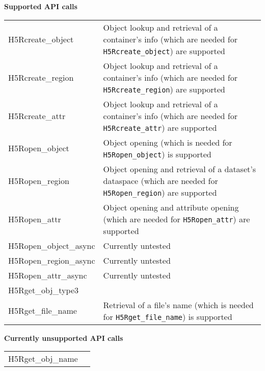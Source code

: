 \documentclass[../users_guide.tex]{subfiles}
\begin{document}
\begin{center}

\textbf{Supported API calls}
\vspace{.2in} \\

\begin{tabularx}{\linewidth}{| X | >{\RaggedRight}X |}
\hline
\rowcolor{lightgray!50}%
\multicolumn{1}{| c |}{\textbf{API call}} & \multicolumn{1}{c |}{\textbf{Notes}} \\ \hline

H5Rcreate\_object & Object lookup and retrieval of a container's info (which are needed for \texttt{H5Rcreate\_object}) are supported\\ \hline
H5Rcreate\_region & Object lookup and retrieval of a container's info (which are needed for \texttt{H5Rcreate\_region}) are supported\\ \hline
H5Rcreate\_attr & Object lookup and retrieval of a container's info (which are needed for \texttt{H5Rcreate\_attr}) are supported\\ \hline
H5Ropen\_object & Object opening (which is needed for \texttt{H5Ropen\_object}) is supported\\ \hline
H5Ropen\_region & Object opening and retrieval of a dataset's dataspace (which are needed for \texttt{H5Ropen\_region}) are supported\\ \hline
H5Ropen\_attr & Object opening and attribute opening (which are needed for \texttt{H5Ropen\_attr}) are supported\\ \hline
H5Ropen\_object\_async & Currently untested\\ \hline
H5Ropen\_region\_async & Currently untested\\ \hline
H5Ropen\_attr\_async & Currently untested\\ \hline
H5Rget\_obj\_type3 & \\ \hline
H5Rget\_file\_name & Retrieval of a file's name (which is needed for \texttt{H5Rget\_file\_name}) is supported\\ \hline

\end{tabularx}

\textbf{Currently unsupported API calls}
\vspace{.2in} \\

\begin{tabularx}{\linewidth}{| X | >{\RaggedRight}X |}
\hline
\rowcolor{lightgray!50}%
\multicolumn{1}{| c |}{\textbf{API call}} & \multicolumn{1}{c |}{\textbf{Notes}} \\ \hline

H5Rget\_obj\_name & \\ \hline

\end{tabularx}

\end{center}
\end{document}
